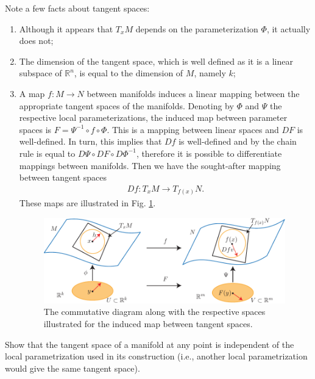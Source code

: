 \begin{remark}[]
	Note a few facts about tangent spaces:
	\begin{enumerate}
		\item Although it appears that $T_{x}M$ depends on the parameterization $\Phi$, it actually does not;
		\item The dimension of the tangent space, which is well defined as it is a linear subspace of $\mathbb{R}^{n}$, is equal to the dimension of $M$, namely $k$;
		\item A map $f:M\to N$ between manifolds induces a linear mapping between the appropriate tangent spaces of the manifolds. Denoting by $\Phi$ and $\Psi$ the respective local parameterizations, the induced map between parameter spaces is $F= \Psi^{-1} \circ f \circ \Phi$. This is a mapping between linear spaces and $DF$ is well-defined. In turn, this implies that $Df$ is well-defined and by the chain rule is equal to $D\Psi \circ DF \circ D\Phi^{-1}$, therefore it is possible to differentiate mappings between manifolds. Then we have the sought-after mapping between tangent spaces 
			\begin{align}
				Df: T_{x}M \to T_{f(x)}N.
			\end{align}
			These maps are illustrated in Fig. \ref{fig:induced_tangent_map}.
			\begin{figure}[h!]
				\centering
				\includegraphics[width=0.99\textwidth]{figures/ch9/7induced_tangent_map.pdf}
				\caption{The commutative diagram along with the respective spaces illustrated for the induced map between tangent spaces.}
				\label{fig:induced_tangent_map}
			\end{figure}
	\end{enumerate}
\end{remark}

\begin{exercise}
Show that the tangent space of a manifold at any point is independent of the local parametrization used in its construction (i.e., another local parametrization would give the same tangent space).
\end{exercise}


